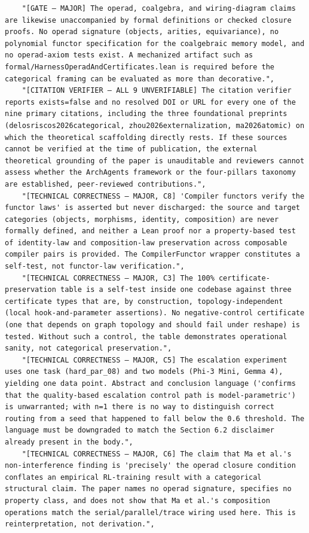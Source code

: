 \documentclass[11pt]{article}
\begin{document}
\begin{verbatim}
    "[GATE — MAJOR] The operad, coalgebra, and wiring-diagram claims are likewise unaccompanied by formal definitions or checked closure proofs. No operad signature (objects, arities, equivariance), no polynomial functor specification for the coalgebraic memory model, and no operad-axiom tests exist. A mechanized artifact such as formal/HarnessOperadAndCertificates.lean is required before the categorical framing can be evaluated as more than decorative.",
    "[CITATION VERIFIER — ALL 9 UNVERIFIABLE] The citation verifier reports exists=false and no resolved DOI or URL for every one of the nine primary citations, including the three foundational preprints (delosriscos2026categorical, zhou2026externalization, ma2026atomic) on which the theoretical scaffolding directly rests. If these sources cannot be verified at the time of publication, the external theoretical grounding of the paper is unauditable and reviewers cannot assess whether the ArchAgents framework or the four-pillars taxonomy are established, peer-reviewed contributions.",
    "[TECHNICAL CORRECTNESS — MAJOR, C8] 'Compiler functors verify the functor laws' is asserted but never discharged: the source and target categories (objects, morphisms, identity, composition) are never formally defined, and neither a Lean proof nor a property-based test of identity-law and composition-law preservation across composable compiler pairs is provided. The CompilerFunctor wrapper constitutes a self-test, not functor-law verification.",
    "[TECHNICAL CORRECTNESS — MAJOR, C3] The 100% certificate-preservation table is a self-test inside one codebase against three certificate types that are, by construction, topology-independent (local hook-and-parameter assertions). No negative-control certificate (one that depends on graph topology and should fail under reshape) is tested. Without such a control, the table demonstrates operational sanity, not categorical preservation.",
    "[TECHNICAL CORRECTNESS — MAJOR, C5] The escalation experiment uses one task (hard_par_08) and two models (Phi-3 Mini, Gemma 4), yielding one data point. Abstract and conclusion language ('confirms that the quality-based escalation control path is model-parametric') is unwarranted; with n=1 there is no way to distinguish correct routing from a seed that happened to fall below the 0.6 threshold. The language must be downgraded to match the Section 6.2 disclaimer already present in the body.",
    "[TECHNICAL CORRECTNESS — MAJOR, C6] The claim that Ma et al.'s non-interference finding is 'precisely' the operad closure condition conflates an empirical RL-training result with a categorical structural claim. The paper names no operad signature, specifies no property class, and does not show that Ma et al.'s composition operations match the serial/parallel/trace wiring used here. This is reinterpretation, not derivation.",

\end{verbatim}
\end{document}
